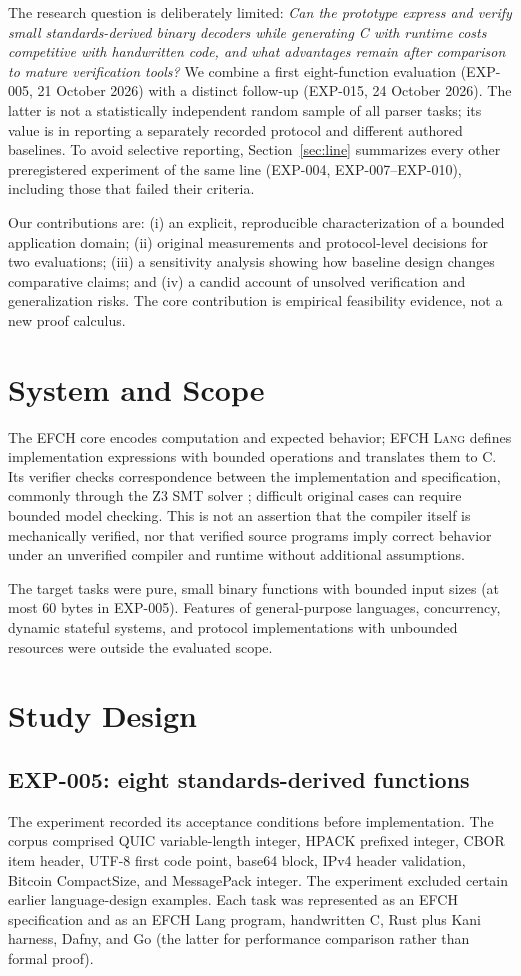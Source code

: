 \documentclass[10pt,twocolumn]{article}
\newcommand{\efch}{\textsc{EFCH Lang}}
\begin{document}
The research question is deliberately limited: \emph{Can the prototype express and verify small standards-derived binary decoders while generating C with runtime costs competitive with handwritten code, and what advantages remain after comparison to mature verification tools?} We combine a first eight-function evaluation (EXP-005, 21 October 2026) with a distinct follow-up (EXP-015, 24 October 2026). The latter is not a statistically independent random sample of all parser tasks; its value is in reporting a separately recorded protocol and different authored baselines. To avoid selective reporting, Section~\ref{sec:line} summarizes every other preregistered experiment of the same line (EXP-004, EXP-007--EXP-010), including those that failed their criteria.

Our contributions are: (i) an explicit, reproducible characterization of a bounded application domain; (ii) original measurements and protocol-level decisions for two evaluations; (iii) a sensitivity analysis showing how baseline design changes comparative claims; and (iv) a candid account of unsolved verification and generalization risks. The core contribution is empirical feasibility evidence, not a new proof calculus.

\section{System and Scope}
The EFCH core encodes computation and expected behavior; \efch{} defines implementation expressions with bounded operations and translates them to C. Its verifier checks correspondence between the implementation and specification, commonly through the Z3 SMT solver \cite{z3}; difficult original cases can require bounded model checking. This is not an assertion that the compiler itself is mechanically verified, nor that verified source programs imply correct behavior under an unverified compiler and runtime without additional assumptions.

The target tasks were pure, small binary functions with bounded input sizes (at most 60 bytes in EXP-005). Features of general-purpose languages, concurrency, dynamic stateful systems, and protocol implementations with unbounded resources were outside the evaluated scope.

\section{Study Design}
\subsection{EXP-005: eight standards-derived functions}
The experiment recorded its acceptance conditions before implementation. The corpus comprised QUIC variable-length integer, HPACK prefixed integer, CBOR item header, UTF-8 first code point, base64 block, IPv4 header validation, Bitcoin CompactSize, and MessagePack integer. The experiment excluded certain earlier language-design examples. Each task was represented as an EFCH specification and as an EFCH Lang program, handwritten C, Rust plus Kani harness, Dafny, and Go (the latter for performance comparison rather than formal proof).
\end{document}
